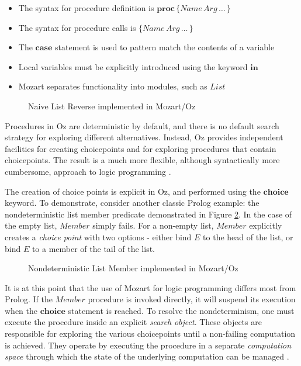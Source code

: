 \begin{itemize}
\item The syntax for procedure definition is $\mathbf{proc}\,\{Name\, Arg\,\dots\,\}$ 
\item The syntax for procedure calls is $\{Name\, Arg\,\dots\,\}$ 
\item The $\mathbf{case}$ statement is used to pattern match the contents
of a variable 
\item Local variables must be explicitly introduced using the keyword $\mathbf{in}$ 
\item Mozart separates functionality into modules, such as $List$ 
\end{itemize}
%
\begin{figure}[t]

\caption{Naive List Reverse implemented in Mozart/Oz\label{fig:Background:Naive-List-Reverse}}

\end{figure}


Procedures in Oz are deterministic by default, and there is no default
search strategy for exploring different alternatives. Instead, Oz
provides independent facilities for creating choicepoints and for
exploring procedures that contain choicepoints. The result is a much
more flexible, although syntactically more cumbersome, approach to
logic programming \citep{lpinoz99}.

The creation of choice points is explicit in Oz, and performed using
the $\mathbf{choice}$ keyword. To demonstrate, consider another classic
Prolog example: the nondeterministic list member predicate demonstrated
in Figure \ref{fig:Background:Nondet-Member}. In the case of the
empty list, $Member$ simply fails. For a non-empty list, $Member$
explicitly creates a \emph{choice point} with two options - either
bind $E$ to the head of the list, or bind $E$ to a member of the
tail of the list.

%
\begin{figure}[t]

\caption{Nondeterministic List Member implemented in Mozart/Oz\label{fig:Background:Nondet-Member}}

\end{figure}


It is at this point that the use of Mozart for logic programming differs
most from Prolog. If the $Member$ procedure is invoked directly,
it will suspend its execution when the $\mathbf{choice}$ statement
is reached. To resolve the nondeterminism, one must execute the procedure
inside an explicit \emph{search} \emph{object}. These objects are
responsible for exploring the various choicepoints until a non-failing
computation is achieved. They operate by executing the procedure in
a separate \emph{computation space} through which the state of the
underlying computation can be managed \citep{schulte00constraint_services}.


